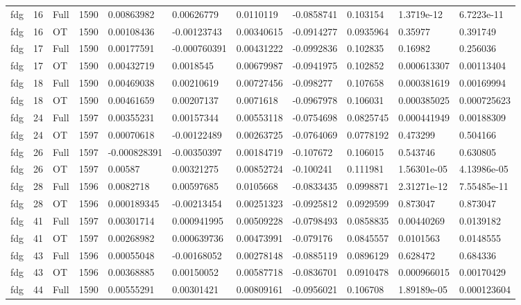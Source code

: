 \begin{landscape}
\begin{longtable}{lllllllllll}
fdg & 16 & Full & 1590 & 0.00863982 & 0.00626779 & 0.0110119 & -0.0858741 & 0.103154 & 1.3719e-12 & 6.7223e-11 \\
fdg & 16 & OT & 1590 & 0.00108436 & -0.00123743 & 0.00340615 & -0.0914277 & 0.0935964 & 0.35977 & 0.391749 \\
fdg & 17 & Full & 1590 & 0.00177591 & -0.000760391 & 0.00431222 & -0.0992836 & 0.102835 & 0.16982 & 0.256036 \\
fdg & 17 & OT & 1590 & 0.00432719 & 0.0018545 & 0.00679987 & -0.0941975 & 0.102852 & 0.000613307 & 0.00113404 \\
fdg & 18 & Full & 1590 & 0.00469038 & 0.00210619 & 0.00727456 & -0.098277 & 0.107658 & 0.000381619 & 0.00169994 \\
fdg & 18 & OT & 1590 & 0.00461659 & 0.00207137 & 0.0071618 & -0.0967978 & 0.106031 & 0.000385025 & 0.000725623 \\
fdg & 24 & Full & 1597 & 0.00355231 & 0.00157344 & 0.00553118 & -0.0754698 & 0.0825745 & 0.000441949 & 0.00188309 \\
fdg & 24 & OT & 1597 & 0.00070618 & -0.00122489 & 0.00263725 & -0.0764069 & 0.0778192 & 0.473299 & 0.504166 \\
fdg & 26 & Full & 1597 & -0.000828391 & -0.00350397 & 0.00184719 & -0.107672 & 0.106015 & 0.543746 & 0.630805 \\
fdg & 26 & OT & 1597 & 0.00587 & 0.00321275 & 0.00852724 & -0.100241 & 0.111981 & 1.56301e-05 & 4.13986e-05 \\
fdg & 28 & Full & 1596 & 0.0082718 & 0.00597685 & 0.0105668 & -0.0833435 & 0.0998871 & 2.31271e-12 & 7.55485e-11 \\
fdg & 28 & OT & 1596 & 0.000189345 & -0.00213454 & 0.00251323 & -0.0925812 & 0.0929599 & 0.873047 & 0.873047 \\
fdg & 41 & Full & 1597 & 0.00301714 & 0.000941995 & 0.00509228 & -0.0798493 & 0.0858835 & 0.00440269 & 0.0139182 \\
fdg & 41 & OT & 1597 & 0.00268982 & 0.000639736 & 0.00473991 & -0.079176 & 0.0845557 & 0.0101563 & 0.0148555 \\
fdg & 43 & Full & 1596 & 0.00055048 & -0.00168052 & 0.00278148 & -0.0885119 & 0.0896129 & 0.628472 & 0.684336 \\
fdg & 43 & OT & 1596 & 0.00368885 & 0.00150052 & 0.00587718 & -0.0836701 & 0.0910478 & 0.000966015 & 0.00170429 \\
fdg & 44 & Full & 1590 & 0.00555291 & 0.00301421 & 0.00809161 & -0.0956021 & 0.106708 & 1.89189e-05 & 0.000123604 \\

\end{longtable}
\end{landscape}
